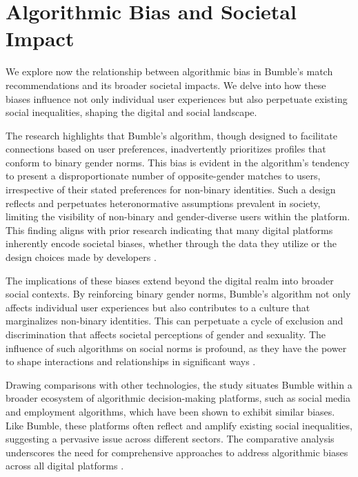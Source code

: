 \section{Algorithmic Bias and Societal Impact}
We explore now the relationship between algorithmic bias in Bumble's match recommendations and its broader societal impacts. We delve into how these biases influence not only individual user experiences but also perpetuate existing social inequalities, shaping the digital and social landscape.

The research highlights that Bumble's algorithm, though designed to facilitate connections based on user preferences, inadvertently prioritizes profiles that conform to binary gender norms. This bias is evident in the algorithm's tendency to present a disproportionate number of opposite-gender matches to users, irrespective of their stated preferences for non-binary identities. Such a design reflects and perpetuates heteronormative assumptions prevalent in society, limiting the visibility of non-binary and gender-diverse users within the platform. This finding aligns with prior research indicating that many digital platforms inherently encode societal biases, whether through the data they utilize or the design choices made by developers \cite{Noble_2018, Benjamin_2019}.

The implications of these biases extend beyond the digital realm into broader social contexts. By reinforcing binary gender norms, Bumble's algorithm not only affects individual user experiences but also contributes to a culture that marginalizes non-binary identities. This can perpetuate a cycle of exclusion and discrimination that affects societal perceptions of gender and sexuality. The influence of such algorithms on social norms is profound, as they have the power to shape interactions and relationships in significant ways \cite{Eubanks_2018}.

Drawing comparisons with other technologies, the study situates Bumble within a broader ecosystem of algorithmic decision-making platforms, such as social media and employment algorithms, which have been shown to exhibit similar biases. Like Bumble, these platforms often reflect and amplify existing social inequalities, suggesting a pervasive issue across different sectors. The comparative analysis underscores the need for comprehensive approaches to address algorithmic biases across all digital platforms \cite{ONeil_2016}.

